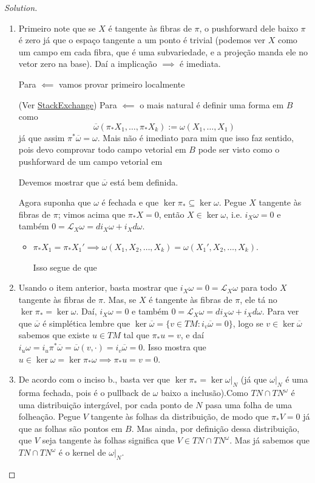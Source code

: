 \begin{proof}[Solution]\leavevmode
\begin{enumerate}[label=\alph*.]
	\item Primeiro note que se $X$ é tangente às fibras de $\pi$, o pushforward dele baixo $\pi$ é zero já que o espaço tangente a um ponto é trivial (podemos ver $X$ como um campo em cada fibra, que é uma subvariedade, e a projeção manda ele no vetor zero na base). Daí a implicação $\implies $ é imediata.

	Para $\impliedby$ vamos provar primeiro localmente

	(Ver \href{https://math.stackexchange.com/questions/69658/basic-differential-forms}{StackExchange}) Para $\impliedby$ o mais natural é definir uma forma em $B$ como
	\[\overline{\omega}(\pi_*X_1,\ldots,\pi_*X_k):=\omega(X_1,\ldots,X_1)\]
já que assim $\pi^*\overline{\omega}=\omega$. Mais não é imediato para mim que isso faz sentido, pois devo comprovar todo campo vetorial em $B$ pode ser visto como o pushforward de um campo vetorial em 

Devemos mostrar que $\overline{\omega}$ está bem definida.

Agora suponha que $\omega$ é fechada e que $\ker \pi_*\subseteq \ker \omega$. Pegue $X$ tangente às fibras de $\pi$; vimos acima que $\pi_*X=0$, então $X\in\ker \omega$, i.e. $i_X\omega=0$ e também $0=\mathcal{L}_{X}\omega =di_X\omega+i_Xd\omega$.

\begin{itemize}
\item {\color{4}$\pi_*X_1=\pi_*X_1'\implies \omega(X_1,X_2,\ldots,X_k)=\omega(X_1',X_2,\ldots,X_k)$.}

	Isso segue de que 
\end{itemize}

\item Usando o item anterior, basta mostrar que $i_X\omega =0=\mathcal{L}_{X}\omega$ para todo $X$ tangente às fibras de $\pi$. Mas, se $X$ é tangente às fibras de $\pi$, ele tá no $\ker \pi_*=\ker \omega$. Daí, $i_X\omega=0$ e também $0=\mathcal{L}_{X}\omega=di_X\omega+i_Xd\omega$. Para ver que $\overline{\omega}$ é simplética lembre que $\ker \overline{\omega}=\{v\in TM: i_{v}\overline{\omega}=0\}$, logo se $v\in\ker \overline{\omega}$ sabemos que existe $u\in TM$ tal que $\pi_*u=v$, e daí $i_u\omega=i_u\pi^*\overline{\omega}=\overline{\omega}(v,\cdot )=i_v\overline{\omega}=0$. Isso mostra que $u\in\ker \omega=\ker \pi_*\omega\implies \pi_*u=v=0$.

	\item De acordo com o inciso b., basta ver que $\ker \pi_*=\ker \omega|_{N}$ (já que $\omega|_{N}$ é uma forma fechada, pois é o pullback de $\omega$ baixo a inclusão).Como $TN\cap TN^\omega$ é uma distribuição intergável, por cada ponto de $N$ pasa uma folha de uma folheação. Pegue $V$ tangente às folhas da distribuição, de modo que  $\pi_*V=0$ já que as folhas são pontos em $B$. Mas ainda, por definição dessa distribuição, que $V$ seja tangente às folhas significa que $V\in TN\cap TN^\omega$. Mas já sabemos que $TN\cap TN^{\omega}$ é o kernel de $\omega|_{N}$.


\end{enumerate}
\end{proof}
